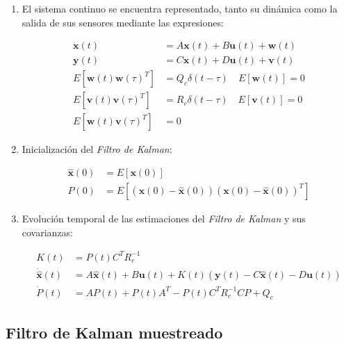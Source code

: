 \begin{enumerate}

\item El sistema continuo se encuentra representado, tanto su dinámica como la salida de sus sensores mediante las expresiones:

\begin{equation}
\begin{split}
	\boldsymbol{\dot{x}}(t) &= A\boldsymbol{x}(t) + B\boldsymbol{u}(t) + \boldsymbol{w}(t) \\
	\boldsymbol{y}(t) &= C\boldsymbol{x}(t) + D\boldsymbol{u}(t) + \boldsymbol{v}(t) \\
	E[\boldsymbol{w}(t)\boldsymbol{w}(\tau)^T] &= Q_c \delta(t-\tau) \quad E[\boldsymbol{w}(t)] = 0 \\
	E[\boldsymbol{v}(t)\boldsymbol{v}(\tau)^T] &= R_c \delta(t-\tau) \quad E[\boldsymbol{v}(t)] = 0 \\
	E[\boldsymbol{w}(t)\boldsymbol{v}(\tau)^T] &= 0
\end{split}
\end{equation}

\item Inicialización del \emph{Filtro de Kalman}:

\begin{equation}
\begin{split}
	\boldsymbol{\hat{x}}(0) &= E[\boldsymbol{x}(0)] \\
	P(0) &= E[(\boldsymbol{x}(0) - \boldsymbol{\hat{x}}(0)) (\boldsymbol{x}(0) - \boldsymbol{\hat{x}}(0))^T]
\end{split}
\end{equation}

\item Evolución temporal de las estimaciones del \emph{Filtro de Kalman} y sus covarianzas: 

\begin{equation}
\begin{split}
	K(t) &= P(t)C^T R_c^{-1} \\
	\boldsymbol{\dot{\hat{x}}}(t) &= A\boldsymbol{\hat{x}}(t) + B\boldsymbol{u}(t) + K(t)(\boldsymbol{y}(t) - C\boldsymbol{\hat{x}}(t) - D\boldsymbol{u}(t)) \\
	\dot{P}(t) &= AP(t) + P(t)A^T - P(t)C^TR_c^{-1}CP + Q_c
\end{split}
\end{equation}

\end{enumerate}

\subsection{Filtro de Kalman muestreado}


